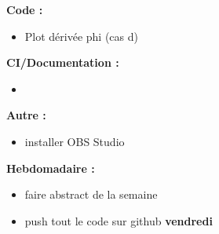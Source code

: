 \textbf{Code :}
\begin{itemize}[label=$\square$] 
	\item Plot dérivée phi (cas d)
\end{itemize}
\textbf{CI/Documentation :}
\begin{itemize}[label=$\square$] 
	\item 
\end{itemize}
\textbf{Autre :}
\begin{itemize}[label=$\square$] 
	\item installer OBS Studio
\end{itemize}
\textbf{Hebdomadaire :}
\begin{itemize}[label=$\square$] 
	\item faire abstract de la semaine 
	\item push tout le code sur github \textbf{vendredi}
\end{itemize}